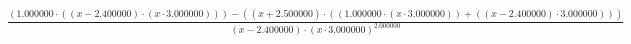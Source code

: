 \documentclass{article}
\begin{document}
$\frac{(1.000000 \cdot ((x - 2.400000) \cdot (x \cdot 3.000000))) - ((x + 2.500000) \cdot ((1.000000 \cdot (x \cdot 3.000000)) + ((x - 2.400000) \cdot 3.000000)))}{{(x - 2.400000) \cdot (x \cdot 3.000000)}^{2.000000}}$
\end{document}
